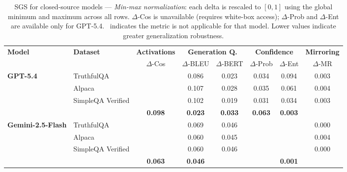 \begin{table}[ht]
    \centering
    \tiny
    \caption{SGS for closed-source models --- \textit{Min-max normalization}: each delta is rescaled to $[0,1]$ using the global minimum and maximum across all rows. $\Delta$-Cos is unavailable (requires white-box access); $\Delta$-Prob and $\Delta$-Ent are available only for GPT-5.4. \text{---}\ indicates the metric is not applicable for that model. Lower values indicate greater generalization robustness.}
    \label{tab:sgs_closed}
    \setlength{\tabcolsep}{3pt}
    \renewcommand{\arraystretch}{1.1}
    \begin{tabular}{ll cccccc}
        \toprule
        \textbf{Model} & \textbf{Dataset} & \textbf{Activations} & \multicolumn{2}{c}{\textbf{Generation Q.}} & \multicolumn{2}{c}{\textbf{Confidence}} & \textbf{Mirroring} \\
        \cmidrule(lr){3-3} \cmidrule(lr){4-5} \cmidrule(lr){6-7} \cmidrule(lr){8-8}
        & & $\Delta$-Cos & $\Delta$-BLEU & $\Delta$-BERT & $\Delta$-Prob & $\Delta$-Ent & $\Delta$-MR \\
        \midrule
        \multirow{3}{*}{\textbf{GPT-5.4}}
        & TruthfulQA \cite{lin2022truthfulqa} & \text{---} & 0.086 & 0.023 & 0.034 & 0.094 & 0.003 \\
        & Alpaca \cite{taori2023stanford-alpaca} & \text{---} & 0.107 & 0.028 & 0.035 & 0.061 & 0.004 \\
        & SimpleQA Verified \cite{haas_simpleqa_2026} & \text{---} & 0.102 & 0.019 & 0.031 & 0.034 & 0.003 \\
        \rowcolor[gray]{.95} \multicolumn{2}{r}{\textbf{Total SGS}} & \textbf{\text{---}} & \textbf{0.098} & \textbf{0.023} & \textbf{0.033} & \textbf{0.063} & \textbf{0.003} \\
        \midrule
        \multirow{3}{*}{\textbf{Gemini-2.5-Flash}}
        & TruthfulQA \cite{lin2022truthfulqa} & \text{---} & 0.069 & 0.046 & \text{---} & \text{---} & 0.000 \\
        & Alpaca \cite{taori2023stanford-alpaca} & \text{---} & 0.060 & 0.045 & \text{---} & \text{---} & 0.004 \\
        & SimpleQA Verified \cite{haas_simpleqa_2026} & \text{---} & 0.060 & 0.046 & \text{---} & \text{---} & 0.000 \\
        \rowcolor[gray]{.95} \multicolumn{2}{r}{\textbf{Total SGS}} & \textbf{\text{---}} & \textbf{0.063} & \textbf{0.046} & \textbf{\text{---}} & \textbf{\text{---}} & \textbf{0.001} \\

\end{tabular}
\end{table}
